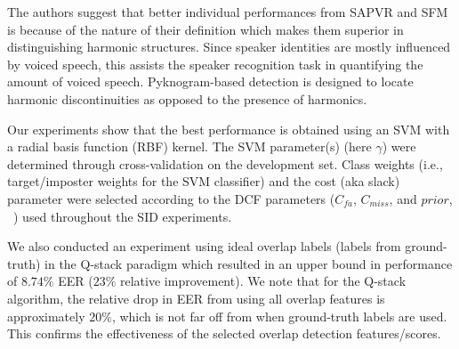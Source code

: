 {\vspace{0mm}

The authors suggest that better individual performances from SAPVR and SFM is because of the nature of their definition which makes them superior in distinguishing harmonic structures. Since speaker identities are mostly influenced by voiced speech, this assists the speaker recognition task in quantifying the amount of voiced speech. Pyknogram-based detection is designed to locate harmonic discontinuities as opposed to the presence of harmonics. 

Our experiments show that the best performance is obtained using an SVM with a radial basis function (RBF) kernel. The SVM parameter(s) (here $\gamma$) were determined through cross-validation on the development set. Class weights (i.e., target/imposter weights for the SVM classifier) and the cost (aka slack) parameter were selected according to the DCF parameters ($C_{fa}$, $C_{miss}$, and $prior$, ~\cite{bosaris}) used throughout the SID experiments. %

We also conducted an experiment using ideal overlap labels (labels from ground-truth) in the Q-stack paradigm which resulted in an upper bound in performance of $8.74\%$ EER ($23\%$ relative improvement). %
We note that for the Q-stack algorithm, the relative drop in EER from using all overlap features is approximately $20\%$, which is not far off from when ground-truth labels are used. This confirms the effectiveness of the selected overlap detection features/scores.  



\vspace{-2mm}
}
